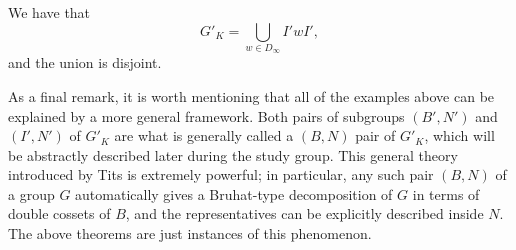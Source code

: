 \begin{theorem}
    We have that
    $$G'_K=\bigcup_{w\in D_\infty}I'wI',$$
    and the union is disjoint.
\end{theorem}

As a final remark, it is worth mentioning that all of the examples above can be explained by a more general framework. Both pairs of subgroups $(B',N')$ and $(I',N')$ of $G'_K$ are what is generally called a $(B,N)$ pair of $G'_K$, which will be abstractly described later during the study group. This general theory introduced by Tits is extremely powerful; in particular, any such pair $(B,N)$ of a group $G$ automatically gives a Bruhat-type decomposition of $G$ in terms of double cossets of $B$, and the representatives can be explicitly described inside $N$. The above theorems are just instances of this phenomenon. 